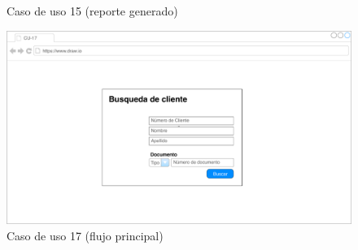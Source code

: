 \documentclass[12pt]{article}
\begin{document}
\begin{figure}[h!]
\caption{Caso de uso 15 (reporte generado)}
\end{figure}
\vfill


\vfill
\begin{figure}[h!]
\includegraphics[width=\textwidth]{CU17/CU-171.pdf}
\caption{Caso de uso 17 (flujo principal)}
\end{figure}
\vfill
\end{document}
